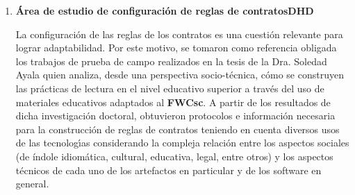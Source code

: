 {\begin{enumerate}
Luego, se propone una arquitectura ideal que describa la incorporación de contratos sensibles al contexto(CSC) utilizando estilos arquitectónicos y patrones de diseño. También, se persigue el propósito del agregado de propiedades de adaptación dinámica a los servicios bases del Framework Sakai. El esquema de la figura \ref{fig:arqAreas} define un mapa conceptual de las disposición de los elementos principales que se tuevieron en cuenta en la áreas denominada: ”Área del estudio de arquitectura y definiciones de arqDHD”. 


\item \textbf{Área de estudio de configuración de reglas de contratosDHD}
 
 
La configuración de las reglas de los contratos es una cuestión relevante para lograr adaptabilidad. Por este motivo, se tomaron como referencia obligada los trabajos de prueba de campo realizados en la tesis de la Dra. Soledad Ayala \cite{tesis:Soledad2014} quien analiza, desde una perspectiva socio-técnica, cómo se construyen las prácticas de lectura en el nivel educativo superior a través del uso de materiales educativos adaptados al \textbf{FWCsc}. A partir de los resultados de dicha investigación doctoral, obtuvieron protocolos e información necesaria para la construcción de reglas de contratos teniendo en cuenta diversos usos de las tecnologı́as considerando la compleja relación entre los aspectos sociales (de índole idiomática, cultural, educativa, legal, entre otros) y los aspectos técnicos de cada uno de los artefactos en particular y de los software en general.


\end{enumerate}}
